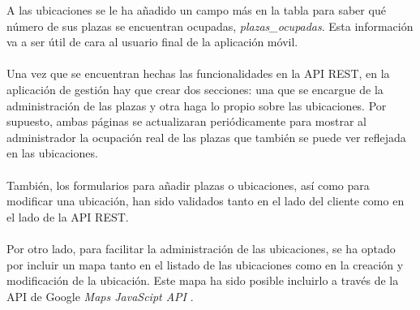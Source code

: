 A las ubicaciones se le ha añadido un campo más en la tabla para saber qué número de sus plazas se encuentran ocupadas, \textit{plazas\_ocupadas}. Esta información va a ser útil de cara al usuario final de la aplicación móvil.
\\\\
Una vez que se encuentran hechas las funcionalidades en la API REST, en la aplicación de gestión hay que crear dos secciones: una que se encargue de la administración de las plazas y otra haga lo propio sobre las ubicaciones. Por supuesto, ambas páginas se actualizaran periódicamente para mostrar al administrador la ocupación real de las plazas que también se puede ver reflejada en las ubicaciones.
\\\\
También, los formularios para añadir plazas o ubicaciones, así como para modificar una ubicación, han sido validados tanto en el lado del cliente como en el lado de la API REST.
\\\\
Por otro lado, para facilitar la administración de las ubicaciones, se ha optado por incluir un mapa tanto en el listado de las ubicaciones como en la creación y modificación de la ubicación. Este mapa ha sido posible incluirlo a través de la API de Google \textit{Maps JavaScipt API} \cite{google-maps-js-api}.

